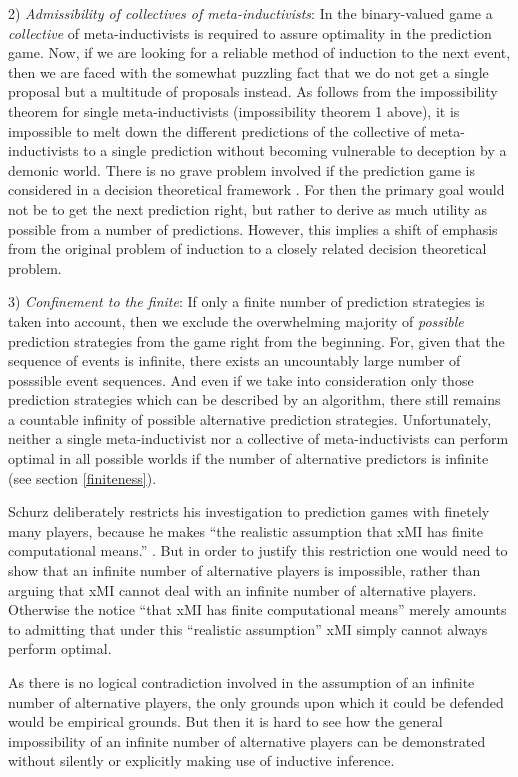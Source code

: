 \documentclass[12pt, a4paper]{article}
\numberwithin{equation}{section}
\begin{document}
2) {\em Admissibility of collectives of meta-inductivists}: In the
binary-valued game a {\em collective} of meta-inductivists is required to
assure optimality in the prediction game. Now, if we are looking for a
reliable method of induction to the next event, then we are faced with
the somewhat puzzling fact that we do not get a single proposal but a
multitude of proposals instead. As follows from the impossibility theorem
for single meta-inductivists (impossibility theorem 1 above), it is
impossible to melt down the different predictions of the collective of
meta-inductivists to a single prediction without becoming vulnerable to
deception by a demonic world. There is no grave problem involved if the
prediction game is considered in a decision theoretical framework
\cite[p. 301ff.]{schurz:2008}. For then the primary goal would not be to
get the next prediction right, but rather to derive as much utility as
possible from a number of predictions. However, this implies a shift of
emphasis from the original problem of induction to a closely related
decision theoretical problem.

3) {\em Confinement to the finite}: If only a finite number of prediction
strategies is taken into account, then we exclude the overwhelming
majority of {\em possible} prediction strategies from the game right from
the beginning. For, given that the sequence of events is infinite, there
exists an uncountably large number of posssible event sequences. And even
if we take into consideration only those prediction strategies which can
be described by an algorithm, there still remains a countable infinity of
possible alternative prediction strategies. Unfortunately, neither a
single meta-inductivist nor a collective of meta-inductivists can perform
optimal in all possible worlds if the number of alternative predictors is
infinite (see section \ref{finiteness}).

Schurz deliberately restricts his investigation to
prediction games with finetely many players, because he makes ``the
realistic assumption that xMI has finite computational means.'' \cite[p.
284]{schurz:2008}. But in order to justify this restriction one would
need to show that an infinite number of alternative players is
impossible, rather than arguing that xMI cannot deal with an infinite
number of alternative players. Otherwise the notice ``that xMI has
finite computational means'' merely amounts to admitting that under
this ``realistic assumption'' xMI simply cannot always perform
optimal.

As there is no logical contradiction involved in the assumption of an
infinite number of alternative players, the only grounds upon which it
could be defended would be empirical grounds. But then it is hard to
see how the general impossibility of an infinite number of alternative
players can be demonstrated without silently or explicitly making use of
inductive inference.
\end{document}
